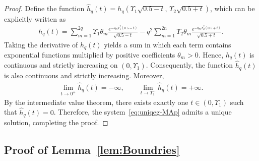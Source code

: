 \documentclass[journal,12pt,onecolumn,draftclsnofoot]{IEEEtran}
\theoremstyle{definition}
\begin{document}
\begin{proof}
Define the function $\hat{h}_q(t) = h_q\!\left(\Upsilon_1\sqrt{0.5 - t},\, \Upsilon_2\sqrt{0.5 + t}\right)$, which can be explicitly written as
\begin{align}
    h_q(t) = 
    \sum_{m=1}^{2q} \Upsilon_1 \theta_m 
    \frac{e^{-\theta_m \Upsilon_1^2 (0.5 - t)}}{\sqrt{0.5 - t}}
    - q^2 \sum_{m=1}^{2n} \Upsilon_2 \theta_m 
    \frac{e^{-\theta_m \Upsilon_2^2 (0.5 + t)}}{\sqrt{0.5 + t}}.
\end{align}
Taking the derivative of $h_q(t)$ yields a sum in which each term contains exponential functions multiplied by positive coefficients $\theta_m > 0$. Hence, $h_q(t)$ is continuous and strictly increasing on $(0, \Upsilon_1)$.  Consequently, the function $\hat{h}_q(t)$ is also continuous and strictly increasing. Moreover,
\begin{align*}
    \lim_{t \to 0^+} \hat{h}_q(t) = -\infty,
\qquad 
\lim_{t \to \Upsilon_1^-} \hat{h}_q(t) = +\infty.
\end{align*}
By the intermediate value theorem, there exists exactly one $t \in (0, \Upsilon_1)$ such that $\hat{h}_q(t) = 0$. 
Therefore, the system~\eqref{eq:uniqeg-MAp} admits a unique solution, completing the proof.
\end{proof}





\subsection{Proof of Lemma~\ref{lem:Boundries}}\label{ap:Boundries}
\end{document}
